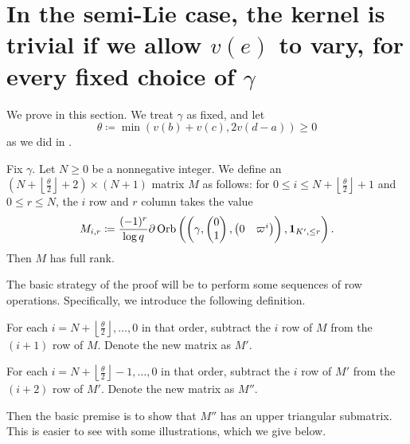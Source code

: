 \section{In the semi-Lie case, the kernel is trivial if we allow $v(e)$ to vary, for every fixed choice of $\gamma$}
We prove  in this section.
We treat $\gamma$ as fixed, and let
\[ \theta \coloneqq \min\left( v(b)+v(c), 2v(d-a) \right) \ge 0 \]
as we did in .

\begin{lemma}
  \label{lem:semi_lie_ker_full_rank}
  Fix $\gamma$. Let $N \ge 0$ be a nonnegative integer.
  We define an $(N+ \left\lfloor \frac{\theta}{2} \right\rfloor + 2) \times (N+1)$ matrix $M$ as follows:
  for $0 \le i \le N+ \left\lfloor \frac{\theta}{2} \right\rfloor + 1$ and $0 \le r \le N$,
  the $i$ row and $r$ column takes the value
  \[
    M_{i,r} \coloneqq \frac{(-1)^r}{\log q} \partial \operatorname{Orb}\left(
      \left(\gamma, \begin{pmatrix} 0 \\ 1 \end{pmatrix}, \begin{pmatrix} 0 & \varpi^i \end{pmatrix} \right),
      \mathbf{1}_{K', \le r} \right).
  \]
  Then $M$ has full rank.
\end{lemma}
The basic strategy of the proof will be to perform some sequences of row operations.
Specifically, we introduce the following definition.
\begin{itemize}
  \ii For each $i = N + \left\lfloor \frac{\theta}{2} \right\rfloor,\dots,0$ in that order,
  subtract the $i$ row of $M$
  from the $(i+1)$ row of $M$.
  Denote the new matrix as $M'$.

  \ii For each $i = N + \left\lfloor \frac{\theta}{2} \right\rfloor - 1,\dots,0$ in that order,
  subtract the $i$ row of $M'$
  from the $(i+2)$ row of $M'$.
  Denote the new matrix as $M''$.
\end{itemize}
Then the basic premise is to show that $M''$ has an upper triangular submatrix.
This is easier to see with some illustrations, which we give below.

